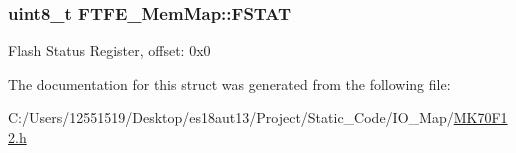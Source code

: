 \subsubsection[{F\+S\+T\+A\+T}]{\setlength{\rightskip}{0pt plus 5cm}uint8\+\_\+t F\+T\+F\+E\+\_\+\+Mem\+Map\+::\+F\+S\+T\+A\+T}\label{struct_f_t_f_e___mem_map_a7e8a4e06df758e3dc251260d71818be8}
Flash Status Register, offset\+: 0x0 

The documentation for this struct was generated from the following file\+:\begin{DoxyCompactItemize}
\item 
C\+:/\+Users/12551519/\+Desktop/es18aut13/\+Project/\+Static\+\_\+\+Code/\+I\+O\+\_\+\+Map/\hyperlink{_m_k70_f12_8h}{M\+K70\+F12.\+h}\end{DoxyCompactItemize}
